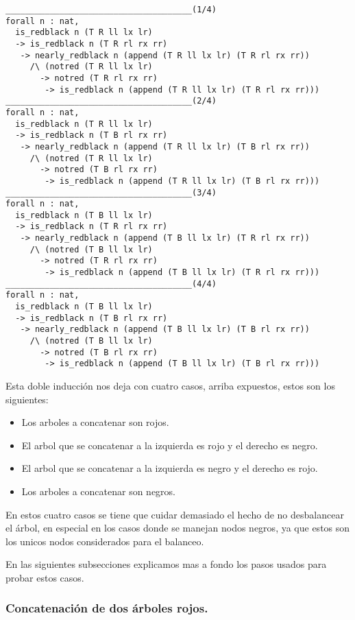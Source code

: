 \begin{verbatim}
______________________________________(1/4)
forall n : nat,
  is_redblack n (T R ll lx lr)
  -> is_redblack n (T R rl rx rr)
   -> nearly_redblack n (append (T R ll lx lr) (T R rl rx rr))
     /\ (notred (T R ll lx lr)
       -> notred (T R rl rx rr)
        -> is_redblack n (append (T R ll lx lr) (T R rl rx rr)))
______________________________________(2/4)
forall n : nat,
  is_redblack n (T R ll lx lr)
  -> is_redblack n (T B rl rx rr)
   -> nearly_redblack n (append (T R ll lx lr) (T B rl rx rr))
     /\ (notred (T R ll lx lr)
       -> notred (T B rl rx rr)
        -> is_redblack n (append (T R ll lx lr) (T B rl rx rr)))
______________________________________(3/4)
forall n : nat,
  is_redblack n (T B ll lx lr)
  -> is_redblack n (T R rl rx rr)
   -> nearly_redblack n (append (T B ll lx lr) (T R rl rx rr))
     /\ (notred (T B ll lx lr)
       -> notred (T R rl rx rr)
        -> is_redblack n (append (T B ll lx lr) (T R rl rx rr)))
______________________________________(4/4)
forall n : nat,
  is_redblack n (T B ll lx lr)
  -> is_redblack n (T B rl rx rr)
   -> nearly_redblack n (append (T B ll lx lr) (T B rl rx rr))
     /\ (notred (T B ll lx lr)
       -> notred (T B rl rx rr)
        -> is_redblack n (append (T B ll lx lr) (T B rl rx rr)))
\end{verbatim}

Esta doble inducci\'on nos deja con cuatro casos, arriba expuestos, estos son los siguientes:
\begin{itemize}
    \item Los arboles a concatenar son rojos.
    \item El arbol que se concatenar a la izquierda es rojo y el derecho es negro.
    \item El arbol que se concatenar a la izquierda es negro y el derecho es rojo.
    \item Los arboles a concatenar son negros.
\end{itemize}

En estos cuatro casos se tiene que cuidar demasiado el hecho de no desbalancear el \'arbol, en
especial en los casos donde se manejan nodos negros, ya que estos son los unicos nodos
considerados para el balanceo.

En las siguientes subsecciones explicamos mas a fondo los pasos usados para probar estos casos.


\subsubsection{Concatenaci\'on de dos \'arboles rojos.}

